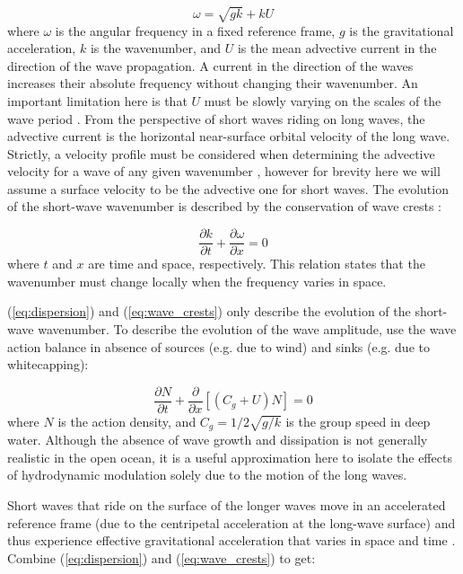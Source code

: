\documentclass[lineno]{jfm}
\begin{document}
\begin{equation}
\label{eq:dispersion}
\omega = \sqrt{gk} + k U
\end{equation}
where $\omega$ is the angular frequency in a fixed reference frame, $g$ is the
gravitational acceleration, $k$ is the wavenumber, and $U$ is the mean advective
current in the direction of the wave propagation.
A current in the direction of the waves increases their absolute frequency
without changing their wavenumber.
An important limitation here is that $U$ must be slowly varying on the scales of
the wave period \citep{bretherton1968wavetrains}.
From the perspective of short waves riding on long waves, the advective current
is the horizontal near-surface orbital velocity of the long wave.
Strictly, a velocity profile must be considered when determining the
advective velocity for a wave of any given wavenumber \citep{stewart1974hf},
however for brevity here we will assume a surface velocity to be the advective
one for short waves.
The evolution of the short-wave wavenumber is described by the conservation of
wave crests \citep{phillips1981dispersion}:

\begin{equation}
\label{eq:wave_crests}
\dfrac{\partial k}{\partial t}
+ \dfrac{\partial \omega}{\partial x}
= 0
\end{equation}
where $t$ and $x$ are time and space, respectively.
This relation states that the wavenumber must change locally when the frequency
varies in space.

(\ref{eq:dispersion}) and (\ref{eq:wave_crests}) only describe the evolution of
the short-wave wavenumber.
To describe the evolution of the wave amplitude, use the wave action balance
\citep{bretherton1968wavetrains} in absence of sources (e.g. due to wind) and
sinks (e.g. due to whitecapping):

\begin{equation}
\label{eq:wave_action}
\dfrac{\partial N}{\partial t}
+ \dfrac{\partial}{\partial x} \left[\left(C_g + U\right)N\right]
= 0
\end{equation}
where $N$ is the action density, and $C_g = 1/2\sqrt{g/k}$ is the group speed
in deep water.
Although the absence of wave growth and dissipation is not generally realistic
in the open ocean, it is a useful approximation here to isolate the effects
of hydrodynamic modulation solely due to the motion of the long waves.

Short waves that ride on the surface of the longer waves move in an accelerated
reference frame (due to the centripetal acceleration at the long-wave surface)
and thus experience effective gravitational acceleration that varies in space
and time \citep{phillips1981dispersion,longuet1986eulerian,longuet1987propagation}.
Combine (\ref{eq:dispersion}) and (\ref{eq:wave_crests}) to get:
\end{document}
